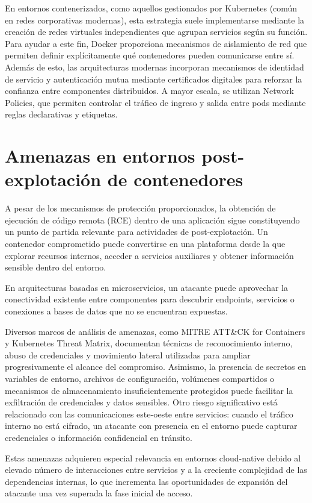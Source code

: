 \documentclass[11pt,spanish,listoffigures,listoftables]{tfgetsinf}
\begin{document}
    En entornos contenerizados, como aquellos gestionados por Kubernetes (común en redes corporativas modernas), esta estrategia suele implementarse mediante la creación de redes virtuales independientes que agrupan servicios según su función. Para ayudar a este fin, Docker proporciona mecanismos de aislamiento de red que permiten definir explícitamente qué contenedores pueden comunicarse entre sí. Además de esto, las arquitecturas modernas incorporan mecanismos de identidad de servicio y autenticación mutua mediante certificados digitales para reforzar la confianza entre componentes distribuidos. A mayor escala, se utilizan Network Policies, que permiten controlar el tráfico de ingreso y salida entre pods mediante reglas declarativas y etiquetas.

    \section{Amenazas en entornos post-explotación de contenedores}
    A pesar de los mecanismos de protección proporcionados, la obtención de ejecución de código remota (RCE) dentro de una aplicación sigue constituyendo un punto de partida relevante para actividades de post-explotación. Un contenedor comprometido puede convertirse en una plataforma desde la que explorar recursos internos, acceder a servicios auxiliares y obtener información sensible dentro del entorno.
    
    En arquitecturas basadas en microservicios, un atacante puede aprovechar la conectividad existente entre componentes para descubrir endpoints, servicios o conexiones a bases de datos que no se encuentran expuestas.
    
    Diversos marcos de análisis de amenazas, como MITRE ATT\&CK for Containers y Kubernetes Threat Matrix, documentan técnicas de reconocimiento interno, abuso de credenciales y movimiento lateral utilizadas para ampliar progresivamente el alcance del compromiso. Asimismo, la presencia de secretos en variables de entorno, archivos de configuración, volúmenes compartidos o mecanismos de almacenamiento insuficientemente protegidos puede facilitar la exfiltración de credenciales y datos sensibles. Otro riesgo significativo está relacionado con las comunicaciones este-oeste entre servicios: cuando el tráfico interno no está cifrado, un atacante con presencia en el entorno puede capturar credenciales o información confidencial en tránsito.
    
    Estas amenazas adquieren especial relevancia en entornos cloud-native debido al elevado número de interacciones entre servicios y a la creciente complejidad de las dependencias internas, lo que incrementa las oportunidades de expansión del atacante una vez superada la fase inicial de acceso.
\end{document}
